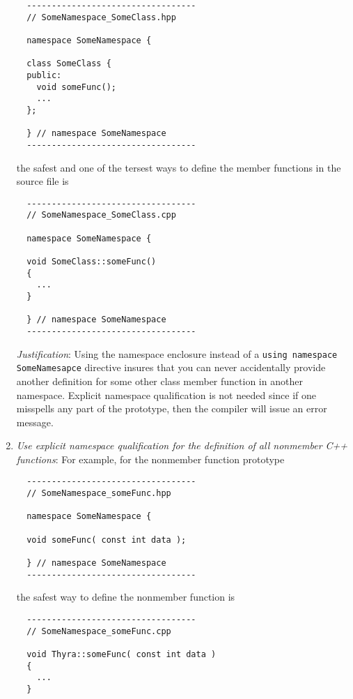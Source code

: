 \begin{enumerate}
{\small\begin{verbatim}
  ----------------------------------
  // SomeNamespace_SomeClass.hpp

  namespace SomeNamespace {

  class SomeClass {
  public:
    void someFunc();
    ...
  };

  } // namespace SomeNamespace
  ----------------------------------
\end{verbatim}}

the safest and one of the tersest ways to define the member functions in the
source file is

{\small\begin{verbatim}
  ----------------------------------
  // SomeNamespace_SomeClass.cpp

  namespace SomeNamespace {

  void SomeClass::someFunc()
  {
    ...
  }

  } // namespace SomeNamespace
  ----------------------------------
\end{verbatim}}

{}\textit{Justification}: Using the namespace enclosure instead of a
{}\texttt{using namespace SomeNamesapce} directive insures that you can never
accidentally provide another definition for some other class member function
in another namespace.  Explicit namespace qualification is not needed since if
one misspells any part of the prototype, then the compiler will issue an error
message.

{}\item\textit{Use explicit namespace qualification for the definition of all
nonmember C++ functions}: For example, for the nonmember function prototype

{\small\begin{verbatim}
  ----------------------------------
  // SomeNamespace_someFunc.hpp

  namespace SomeNamespace {

  void someFunc( const int data );

  } // namespace SomeNamespace
  ----------------------------------
\end{verbatim}}

the safest way to define the nonmember function is

{\small\begin{verbatim}
  ----------------------------------
  // SomeNamespace_someFunc.cpp

  void Thyra::someFunc( const int data )
  {
    ...
  }


\end{verbatim}}
\end{enumerate}
